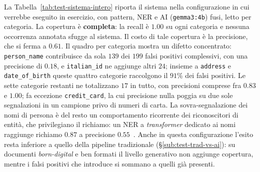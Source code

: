 La Tabella~\ref{tab:test-sistema-intero} riporta il sistema nella configurazione in cui verrebbe eseguito in esercizio, con pattern, NER e AI (\texttt{gemma3:4b}) fusi, letto per categoria. La copertura è \textbf{completa}: la recall è $1.00$ su ogni categoria e nessuna occorrenza annotata sfugge al sistema. Il costo di tale copertura è la precisione, che si ferma a $0.61$. Il quadro per categoria mostra un difetto concentrato: \texttt{person\_name} contribuisce da sola $139$ dei $199$ falsi positivi complessivi, con una precisione di $0.18$, e \texttt{italian\_id} ne aggiunge altri $24$; insieme a \texttt{address} e \texttt{date\_of\_birth} queste quattro categorie raccolgono il $91$\% dei falsi positivi. Le sette categorie restanti ne totalizzano $17$ in tutto, con precisioni comprese fra $0.83$ e $1.00$; fa eccezione \texttt{credit\_card}, la cui precisione nulla poggia su due sole segnalazioni in un campione privo di numeri di carta. La sovra-segnalazione dei nomi di persona è del resto un comportamento ricorrente dei riconoscitori di entità, che privilegiano il richiamo: un NER a \textit{transformer} dedicato ai nomi raggiunge richiamo $0.87$ a precisione $0.55$~\cite{meldauAutomatedRedactionNames2024}. Anche in questa configurazione l'esito resta inferiore a quello della pipeline tradizionale (§\ref{sub:test-trad-vs-ai}): su documenti \emph{born-digital} e ben formati il livello generativo non aggiunge copertura, mentre i falsi positivi che introduce si sommano a quelli già presenti.

